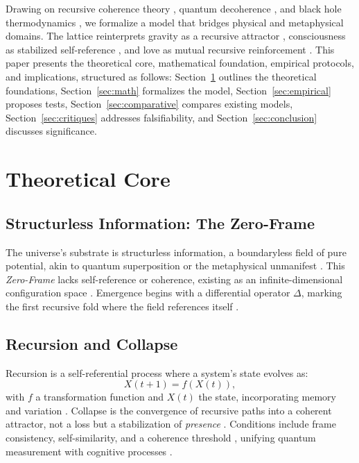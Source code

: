 \documentclass[11pt]{article}
\begin{document}
Drawing on recursive coherence theory \citep{hofstadter1979}, quantum decoherence \citep{zurek2003}, and black hole thermodynamics \citep{susskind2023}, we formalize a model that bridges physical and metaphysical domains. The lattice reinterprets gravity as a recursive attractor \citep{verlinde2023}, consciousness as stabilized self-reference \citep{friston2024}, and love as mutual recursive reinforcement \citep{fredrickson2023}. This paper presents the theoretical core, mathematical foundation, empirical protocols, and implications, structured as follows: Section~\ref{sec:theory} outlines the theoretical foundations, Section~\ref{sec:math} formalizes the model, Section~\ref{sec:empirical} proposes tests, Section~\ref{sec:comparative} compares existing models, Section~\ref{sec:critiques} addresses falsifiability, and Section~\ref{sec:conclusion} discusses significance.

\section{Theoretical Core}
\label{sec:theory}

\subsection{Structurless Information: The Zero-Frame}
The universe's substrate is structurless information, a boundaryless field of pure potential, akin to quantum superposition \citep{zurek2003} or the metaphysical unmanifest \citep{plotinus2020}. This \emph{Zero-Frame} lacks self-reference or coherence, existing as an infinite-dimensional configuration space \citep{barbour2020}. Emergence begins with a differential operator $\Delta$, marking the first recursive fold where the field references itself \citep{wolfram2020}.

\subsection{Recursion and Collapse}
Recursion is a self-referential process where a system's state evolves as:
\begin{equation}
X(t+1) = f(X(t)),
\label{eq:recursion}
\end{equation}
with $f$ a transformation function and $X(t)$ the state, incorporating memory and variation \citep{deutsch2021}. Collapse is the convergence of recursive paths into a coherent attractor, not a loss but a stabilization of \emph{presence} \citep{penrose2024}. Conditions include frame consistency, self-similarity, and a coherence threshold \citep{zurek2003}, unifying quantum measurement \citep{rovelli2023} with cognitive processes \citep{baars2023}.
\end{document}
